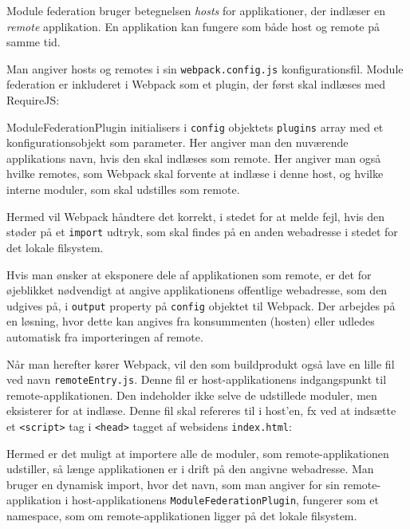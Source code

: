 \documentclass[]{article}
\begin{document}
Module federation bruger betegnelsen \emph{hosts} for applikationer, der
indlæser en \emph{remote} applikation. En applikation kan fungere som
både host og remote på samme tid.

Man angiver hosts og remotes i sin \texttt{webpack.config.js}
konfigurationsfil. Module federation er inkluderet i Webpack som et
plugin, der først skal indlæses med RequireJS:

ModuleFederationPlugin initialisers i \texttt{config} objektets
\texttt{plugins} array med et konfigurationsobjekt som parameter. Her
angiver man den nuværende applikations navn, hvis den skal indlæses som
remote. Her angiver man også hvilke remotes, som Webpack skal forvente
at indlæse i denne host, og hvilke interne moduler, som skal udstilles
som remote.

Hermed vil Webpack håndtere det korrekt, i stedet for at melde fejl,
hvis den støder på et \texttt{import} udtryk, som skal findes på en
anden webadresse i stedet for det lokale filsystem.

Hvis man ønsker at eksponere dele af applikationen som remote, er det
for øjeblikket nødvendigt at angive applikationens offentlige
webadresse, som den udgives på, i \texttt{output} property på
\texttt{config} objektet til Webpack. Der arbejdes på en løsning, hvor
dette kan angives fra konsummenten (hosten) eller udledes automatisk fra
importeringen af remote.

Når man herefter kører Webpack, vil den som buildprodukt også lave en
lille fil ved navn \texttt{remoteEntry.js}. Denne fil er
host-applikationens indgangspunkt til remote-applikationen. Den
indeholder ikke selve de udstillede moduler, men eksisterer for at
indlæse. Denne fil skal refereres til i host'en, fx ved at indsætte et
\texttt{\textless{}script\textgreater{}} tag i
\texttt{\textless{}head\textgreater{}} tagget af websidens
\texttt{index.html}:

Hermed er det muligt at importere alle de moduler, som
remote-applikationen udstiller, så længe applikationen er i drift på den
angivne webadresse. Man bruger en dynamisk import, hvor det navn, som
man angiver for sin remote-applikation i host-applikationens
\texttt{ModuleFederationPlugin}, fungerer som et namespace, som om
remote-applikationen ligger på det lokale filsystem.
\end{document}
